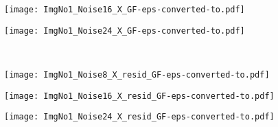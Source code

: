 \documentclass{article}
\begin{document}
\begin{figure*}[th]
\begin{multicols}{2}
\begin{minipage}[b]{0.28\linewidth}
		\end{minipage} 
		\begin{minipage}[b]{0.28\linewidth}
			\centering
			\texttt{[image: ImgNo1\_Noise16\_X\_GF-eps-converted-to.pdf]}
		\end{minipage} 
		\begin{minipage}[b]{0.28\linewidth}
			\centering
			\texttt{[image: ImgNo1\_Noise24\_X\_GF-eps-converted-to.pdf]}
		\end{minipage} 
		\\
		\begin{minipage}[b]{0.1\linewidth}
		\end{minipage} 
		\begin{minipage}[b]{0.28\linewidth}
			\centering
			\texttt{[image: ImgNo1\_Noise8\_X\_resid\_GF-eps-converted-to.pdf]}
		\end{minipage} 
		\begin{minipage}[b]{0.28\linewidth}
			\centering
			\texttt{[image: ImgNo1\_Noise16\_X\_resid\_GF-eps-converted-to.pdf]}
		\end{minipage} 
		\begin{minipage}[b]{0.28\linewidth}
			\centering
			\texttt{[image: ImgNo1\_Noise24\_X\_resid\_GF-eps-converted-to.pdf]}
		\end{minipage} 
		\\
		\begin{minipage}[b]{0.1\linewidth}
			\centering	%
		\end{minipage}
		\begin{minipage}[b]{0.28\linewidth}
		\end{minipage} 
		\begin{minipage}[b]{0.28\linewidth}
		\end{minipage} 
		\begin{minipage}[b]{0.28\linewidth}
		\end{minipage}
		\\
		\begin{minipage}[b]{0.1\linewidth}

\end{minipage}
\end{multicols}
\end{figure*}
\end{document}
